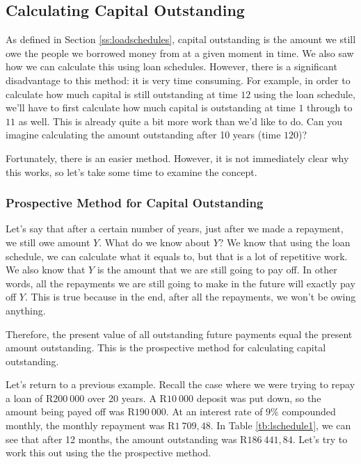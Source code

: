 \subsection{Calculating Capital Outstanding}
\label{ss:capitaloutstanding}

As defined in Section \ref{ss:loadschedules}, capital outstanding is the amount we still owe the people we borrowed money from at a given moment in time. We also saw how we can calculate this using loan schedules. However, there is a significant disadvantage to this method: it is very time consuming. For example, in order to calculate how much capital is still outstanding at time $12$ using the loan schedule, we'll have to first calculate how much capital is outstanding at time $1$ through to $11$ as well. This is already quite a bit more work than we'd like to do. Can you imagine calculating the amount outstanding after 10 years (time $120$)?

Fortunately, there is an easier method. However, it is not immediately clear why this works, so let's take some time to examine the concept.

\subsubsection{Prospective Method for Capital Outstanding}

Let's say that after a certain number of years, just after we made a repayment, we still owe amount $Y$. What do we know about $Y$? We know that using the loan schedule, we can calculate what it equals to, but that is a lot of repetitive work. We also know that $Y$ is the amount that we are still going to pay off. In other words, all the repayments we are still going to make in the future will exactly pay off $Y$. This is true because in the end, after all the repayments, we won't be owing anything.

Therefore, the present value of all outstanding future payments equal the present amount outstanding. This is the prospective method for calculating capital outstanding.

Let's return to a previous example. Recall the case where we were trying to repay a loan of R$200~000$ over 20 years. A R$10~000$ deposit was put down, so the amount being payed off was R$190~000$. At an interest rate of $9\%$ compounded monthly, the monthly repayment was R$1~709,48$. In Table \ref{tb:lschedule1}, we can see that after 12 months, the amount outstanding was R$186~441,84$. Let's try to work this out using the the prospective method.

